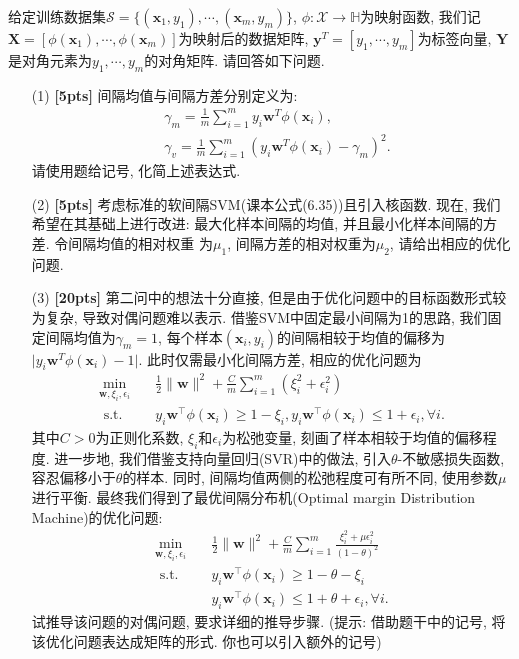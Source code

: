 \documentclass[a4paper,UTF8]{article}
\numberwithin{equation}{section}
\theoremstyle{definition}
\def \X {\boldsymbol{X}}
\def \Y {\boldsymbol{Y}}
\def \w {\boldsymbol{w}}
\def \y {\boldsymbol{y}}
\def \x {\boldsymbol{x}}
\begin{document}
给定训练数据集$\mathcal{S} = \{(\x_1, y_1), \cdots, (\x_m, y_m)\}$, $\phi: \mathcal{X} \to \mathbb{H}$为映射函数, 
我们记$\X = \left[\phi(\x_1), \cdots, \phi(\x_m)\right]$为映射后的数据矩阵, $\y^T = [y_1, \cdots, y_m]$为标签向量, $\Y$是对角元素为$y_1, \cdots, y_m$的对角矩阵. 请回答如下问题.
\begin{enumerate}
    \item[(1)] \textbf{[5pts]} 间隔均值与间隔方差分别定义为:
    \begin{align*}
        &\gamma_m = \frac1m \sum_{i=1}^m y_i \w^T \phi(\x_i), \\
        &\gamma_v = \frac1m \sum_{i=1}^m (y_i\w^T\phi(\x_i) - \gamma_m)^2.
    \end{align*}
    请使用题给记号, 化简上述表达式.
    \item[(2)] \textbf{[5pts]} 考虑标准的软间隔SVM(课本公式(6.35))且引入核函数. 现在, 我们希望在其基础上进行改进: 最大化样本间隔的均值, 并且最小化样本间隔的方差. 令间隔均值的相对权重
    为$\mu_1$, 间隔方差的相对权重为$\mu_2$, 请给出相应的优化问题.
    \item[(3)] \textbf{[20pts]} 第二问中的想法十分直接, 但是由于优化问题中的目标函数形式较为复杂, 导致对偶问题难以表示. 借鉴SVM中固定最小间隔为1的思路, 我们固定间隔均值为$\gamma_m = 1$,
    每个样本$(\x_i, y_i)$的间隔相较于均值的偏移为$\lvert y_i \w^T \phi(\x_i) - 1\rvert$. 此时仅需最小化间隔方差, 相应的优化问题为
    \begin{align*}
        \min _{\boldsymbol{w}, \xi_i, \epsilon_i} & \quad \frac{1}{2}\|\boldsymbol{w}\|^2+ \frac{C}{m} \sum_{i=1}^m\left(\xi_i^2+\epsilon_i^2\right) \\
        \text { s.t. } & \quad y_i \boldsymbol{w}^{\top} \phi\left(\x_i\right) \geq 1-\xi_i, y_i \boldsymbol{w}^{\top} \phi\left(\x_i\right) \leq 1+\epsilon_i, \forall i .
    \end{align*}
    其中$C > 0$为正则化系数, $\xi_i$和$\epsilon_i$为松弛变量, 刻画了样本相较于均值的偏移程度. 进一步地, 我们借鉴支持向量回归(SVR)中的做法, 引入$\theta$-不敏感损失函数, 
    容忍偏移小于$\theta$的样本. 同时, 间隔均值两侧的松弛程度可有所不同, 使用参数$\mu$进行平衡. 最终我们得到了最优间隔分布机(Optimal margin Distribution Machine)的优化问题:
    \begin{align*}
        \min _{\boldsymbol{w}, \xi_i, \epsilon_i} & \quad \frac{1}{2}\|\boldsymbol{w}\|^2+ \frac{C}{m} \sum_{i=1}^m \frac{\xi_i^2+\mu \epsilon_i^2}{(1-\theta)^2} \\
        \text { s.t. } & \quad y_i \boldsymbol{w}^{\top} \phi\left(\x_i\right) \geq 1-\theta-\xi_i \\
        & \quad y_i \boldsymbol{w}^{\top} \phi\left(\x_i\right) \leq 1+\theta+\epsilon_i, \forall i.
    \end{align*}
    试推导该问题的对偶问题, 要求详细的推导步骤.
    (提示: 借助题干中的记号, 将该优化问题表达成矩阵的形式. 你也可以引入额外的记号)
\end{enumerate}
\end{document}
